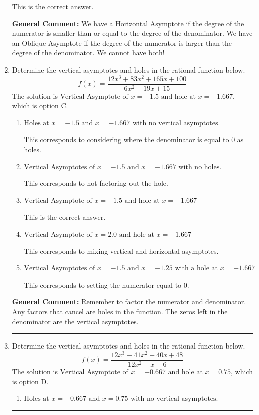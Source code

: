 \documentclass{extbook}[14pt]
\newcommand{\litem}[1]{\item #1

\rule{\textwidth}{0.4pt}}
\begin{document}
\begin{enumerate}
{\begin{enumerate}[label=\Alph*.]
This is the correct answer.
\end{enumerate}

\textbf{General Comment:} We have a Horizontal Asymptote if the degree of the numerator is smaller than or equal to the degree of the denominator. We have an Oblique Asymptote if the degree of the numerator is larger than the degree of the denominator. We cannot have both!
}
\litem{
Determine the vertical asymptotes and holes in the rational function below.
\[ f(x) = \frac{12x^{3} +83 x^{2} +165 x + 100}{6x^{2} +19 x + 15} \]The solution is \( \text{Vertical Asymptote of } x = -1.5 \text{ and hole at } x = -1.667 \), which is option C.\begin{enumerate}[label=\Alph*.]
\item \( \text{Holes at } x = -1.5 \text{ and } x = -1.667 \text{ with no vertical asymptotes.} \)

This corresponds to considering where the denominator is equal to 0 as holes.
\item \( \text{Vertical Asymptotes of } x = -1.5 \text{ and } x = -1.667 \text{ with no holes.} \)

This corresponds to not factoring out the hole.
\item \( \text{Vertical Asymptote of } x = -1.5 \text{ and hole at } x = -1.667 \)

This is the correct answer.
\item \( \text{Vertical Asymptote of } x = 2.0 \text{ and hole at } x = -1.667 \)

This corresponds to mixing vertical and horizontal asymptotes.
\item \( \text{Vertical Asymptotes of } x = -1.5 \text{ and } x = -1.25 \text{ with a hole at } x = -1.667 \)

This corresponds to setting the numerator equal to 0.
\end{enumerate}

\textbf{General Comment:} Remember to factor the numerator and denominator. Any factors that cancel are holes in the function. The zeros left in the denominator are the vertical asymptotes.
}
\litem{
Determine the vertical asymptotes and holes in the rational function below.
\[ f(x) = \frac{12x^{3} -41 x^{2} -40 x + 48}{12x^{2} -x -6} \]The solution is \( \text{Vertical Asymptote of } x = -0.667 \text{ and hole at } x = 0.75 \), which is option D.\begin{enumerate}[label=\Alph*.]
\item \( \text{Holes at } x = -0.667 \text{ and } x = 0.75 \text{ with no vertical asymptotes.} \)


\end{enumerate}}
\end{enumerate}
\end{document}
